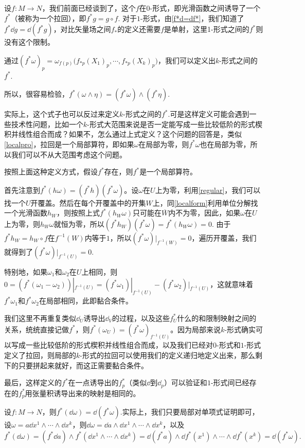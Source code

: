 \para 设$f:M\to N$，我们前面已经谈到了，这个$f$在0-形式，即光滑函数之间诱导了一个$f^*$（被称为一个拉回），即$f^*g=g\circ f$. 对于$1$-形式，由\eqref{f*d=df*}，我们知道了$f^*\dd g=\dd (f^* g)$，对比矢量场之间$f_*$的定义还需要$f$是单射，这里1-形式之间的$f^*$则没有这个限制。

通过$(f^*\omega)_p=\omega_{f(p)}\bigl(f_{*p}(X_1)_p,\cdots,f_{*p}(X_k)_p\bigr)$，我们可以定义出$k$-形式之间的$f^*$.

\para 所以，很容易检验，$f^*(\omega\wedge \eta)=(f^*\omega)\wedge (f^*\eta)$.

实际上，这个式子也可以反过来定义$k$-形式之间的$f^*$.可是这样定义可能会遇到一些技术性问题，比如一个$k$-形式大范围来说是否一定能写成一些比较低阶的形式楔积并线性组合而成？如果不，怎么通过上式定义？这个问题的回答是，类似\eqref{localpro}，拉回是一个局部算符，即如果$\omega$在局部为零，则$f^*\omega$也在局部为零，所以我们可以不从大范围考虑这个问题。

\para 按照上面这种定义方式，假设$f^*$存在，则$f^*$是一个局部算符。

首先注意到$f^*(h\omega)=(f^*h)(f^*\omega)$。设$\omega$在$U$上为零，利用\eqref{regular}，我们可以找一个$U$开覆盖。然后在每个开覆盖中的开集$W$上，同\eqref{localform}利用单位分解找一个光滑函数$h_W$，则按照上式$f^*(h_W\omega)$只可能在$\overline{W}$内不为零，因此，如果$\omega$在$U$上为零，则$h_W\omega$就恒为零，所以$(f^*h_W)(f^*\omega)=f^*(h_W\omega)=0$. 由于$f^*h_W=h_W\circ f$在$f^{-1}(W)$内等于$1$，所以$(f^*\omega)|_{f^{-1}(W)}=0$，遍历开覆盖，我们就得到了$(f^*\omega)|_{f^{-1}(U)}=0$.

特别地，如果$\omega_1$和$\omega_2$在$U$上相同，则$0=(f^*(\omega_1-\omega_2))|_{f^{-1}(U)}=(f^*\omega_1)|_{f^{-1}(U)}-(f^*\omega_2)|_{f^{-1}(U)}$，这就意味着$f^*\omega_1$和$f^*\omega_2$在局部相同，此即黏合条件。

我们这里不再重复类似$\dd_U$诱导出$\dd_V$的过程，以及这些$f^*_U$什么的和限制映射之间的关系，统统直接记做$f^*$，则$f^*(\omega_{U})=(f^* \omega)_{f^{-1}(U)}$。因为局部来说$k$-形式确实可以写成一些比较低阶的形式楔积并线性组合而成，以及我们已经对$0$-形式和$1$-形式定义了拉回，则局部的$k$-形式的拉回可以使用我们的定义递归地定义出来，那么剩下的只要拼起来就好，而这正需要黏合条件。

最后，这样定义的$f^*$在一点诱导出的$f^*_p$（类似$\dd$到$\dd_p$）可以验证和$1$-形式间已经存在的$f^*_p$用张量积诱导出来的映射是相同的。

\para 设$f:M\to N$，则$f^*(\dd \omega)=\dd (f^*\omega)$.实际上，我们只要局部对单项式证明即可，设$\omega=a\dd x^{1}\wedge\cdots\wedge \dd x^{k}$，则$\dd \omega=\dd a\wedge \dd x^{1}\wedge\cdots\wedge \dd x^{k}$，以及
\[
	f^*(\dd \omega)=(f^*\dd a)\wedge f^*(\dd x^{1}\wedge\cdots\wedge \dd x^{k})=\dd (f^*a)\wedge \dd f^*(x^{1})\wedge\cdots\wedge \dd f^*(x^{k})=\dd (f^*\omega).
\]

